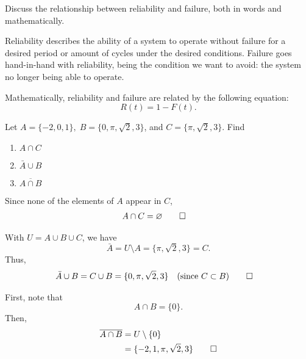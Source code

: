 \begin{hwkProblem}{2}{}

	Discuss the relationship between reliability and failure, both in words and mathematically.

	\hwkSol

	Reliability describes the ability of a system to operate without failure for a desired period or amount of cycles under the desired conditions. Failure goes hand-in-hand with reliability, being the condition we want to avoid: the system no longer being able to operate.

	Mathematically, reliability and failure are related by the following equation:
	\[
		R(t)=1-F(t)
	.\]

\end{hwkProblem}

\begin{hwkProblem}{3}{}

	Let \(A=\{-2,0,1\},\; B=\{0,\pi,\sqrt{2},3\}\), and \(C=\{\pi,\sqrt{2},3\}\). Find
	\begin{enumerate}
		\item \(A \cap C\)
		\item \(\bar{A} \cup B\)
		\item \(\overline{A \cap B}\)
	\end{enumerate}

	\hwkSol

	\hwkPart

	Since none of the elements of \(A\) appear in \(C\),
	\begin{align*}
		A \cap C &= \varnothing \qed
	\end{align*}

	\hwkPart

	With \(U=A\cup B\cup C\), we have 
	\[
		\bar{A} = U\setminus A = \{\pi,\sqrt{2},3\} = C.
	\]
	Thus,
	\begin{align*}
		\bar{A} \cup B &= C \cup B = \{0,\pi,\sqrt{2},3\} \quad (\text{since } C\subset B) \qed
	\end{align*}

	\hwkPart

	First, note that
	\[
		A \cap B = \{0\}.
	\]
	Then,
	\begin{align*}
		\overline{A \cap B} &= U\setminus \{0\} \\
				    &= \{-2,1,\pi,\sqrt{2},3\} \qed
	\end{align*}

\end{hwkProblem}

